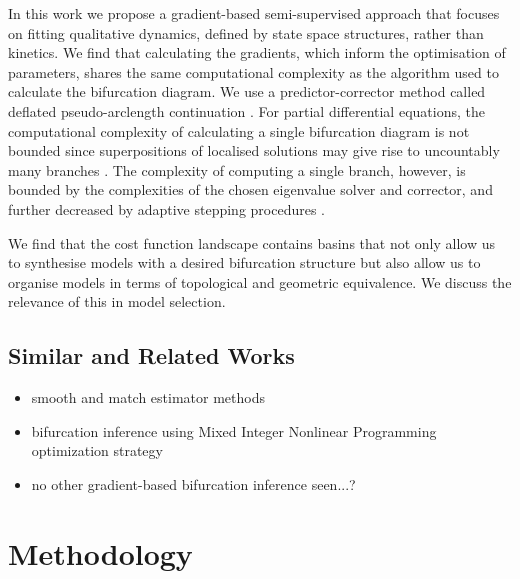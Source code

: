In this work we propose a gradient-based semi-supervised approach that focuses on fitting qualitative dynamics, defined by state space structures, rather than kinetics. We find that calculating the gradients, which inform the optimisation of parameters, shares the same computational complexity as the algorithm used to calculate the bifurcation diagram. We use a predictor-corrector method called deflated pseudo-arclength continuation \cite{Farrell2016TheDiagrams,Veltz2019PseudoArcLengthContinuation.jl}. For partial differential equations, the computational complexity of calculating a single bifurcation diagram is not bounded since superpositions of localised solutions may give rise to uncountably many branches \cite{Avitabile2010ToEquation}. The complexity of computing a single branch, however, is bounded by the complexities of the chosen eigenvalue solver and corrector, and further decreased by adaptive stepping procedures \cite{Aruliah2016AlgorithmContinuation}.

We find that the cost function landscape contains basins that not only allow us to synthesise models with a desired bifurcation structure but also allow us to organise models in terms of topological and geometric equivalence. We discuss the relevance of this in model selection.

\subsection{Similar and Related Works}

\begin{itemize}
    \item smooth and match estimator methods \cite{Ranciati2017BayesianParameters}
    \item bifurcation inference using Mixed Integer Nonlinear Programming optimization strategy \cite{Otero-Muras2018Optimization-basedModels}
    \item no other gradient-based bifurcation inference seen...?
\end{itemize}
\clearpage

\section{Methodology}

